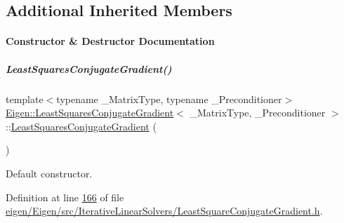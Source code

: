\subsection*{Additional Inherited Members}


\paragraph{Constructor \& Destructor Documentation}
\mbox{\label{group___iterative_linear_solvers___module_ace69f423fcc1f8960d0e2de0667447c9}} 
\subparagraph{\texorpdfstring{Least\+Squares\+Conjugate\+Gradient()}{LeastSquaresConjugateGradient()}\hspace{0.1cm}{\footnotesize\ttfamily [1/4]}}
{\footnotesize\ttfamily template$<$typename \+\_\+\+Matrix\+Type, typename \+\_\+\+Preconditioner$>$ \\
\hyperlink{group___iterative_linear_solvers___module_class_eigen_1_1_least_squares_conjugate_gradient}{Eigen\+::\+Least\+Squares\+Conjugate\+Gradient}$<$ \+\_\+\+Matrix\+Type, \+\_\+\+Preconditioner $>$\+::\hyperlink{group___iterative_linear_solvers___module_class_eigen_1_1_least_squares_conjugate_gradient}{Least\+Squares\+Conjugate\+Gradient} (\begin{DoxyParamCaption}{ }\end{DoxyParamCaption})\hspace{0.3cm}{\ttfamily [inline]}}

Default constructor. 

Definition at line \hyperlink{eigen_2_eigen_2src_2_iterative_linear_solvers_2_least_square_conjugate_gradient_8h_source_l00166}{166} of file \hyperlink{eigen_2_eigen_2src_2_iterative_linear_solvers_2_least_square_conjugate_gradient_8h_source}{eigen/\+Eigen/src/\+Iterative\+Linear\+Solvers/\+Least\+Square\+Conjugate\+Gradient.\+h}.

